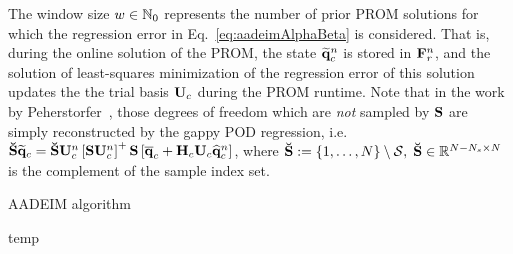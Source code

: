 The window size $w \in \mathbb{N}_0$ represents the number of prior PROM solutions for which the regression error in Eq.~\ref{eq:aadeimAlphaBeta} is considered. That is, during the online solution of the PROM, the state $\mathbf{\widetilde{q}}_{c}^{n}$ is stored in $\resWindow^{\timeIdx}$, and the solution of least-squares minimization of the regression error of this solution updates the the trial basis $\consTrial$ during the PROM runtime. Note that in the work by Peherstorfer~\cite{Peherstorfer2020Adaptive}, those degrees of freedom which are \textit{not} sampled by $\mathbf{S}$ are simply reconstructed by the gappy POD regression, i.e. $\sampMatComp \consVecRom = \sampMatComp \consTrial^{\timeIdx} \left[\sampMat \consTrial^{\timeIdx}\right]^+ \sampMat \left[\consVecCent + \consScale \consTrial \consVecCoef^{\timeIdx}\right]$, where $\mathbf{\breve{S}} := \{1,\hdots,N \} \setminus \mathcal{S}, \; \mathbf{\breve{S}} \in \mathbb{R}^{N-N_s \times N}$ is the complement of the sample index set.

\begin{algorithm}
	\caption{AADEIM algorithm}\label{alg:aadeim}
	\begin{algorithmic}
		\STATE temp
	\end{algorithmic}
\end{algorithm}

